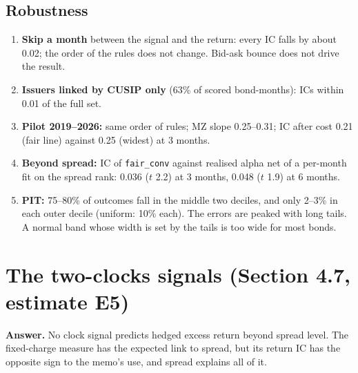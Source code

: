 \documentclass[11pt,a4paper]{article}
\newcommand{\code}[1]{\texttt{\small #1}}
\begin{document}
\subsection*{Robustness}
\begin{enumerate}
\item \textbf{Skip a month} between the signal and the return: every IC falls by about 0.02; the order of the rules does not change. Bid-ask bounce does not drive the result.
\item \textbf{Issuers linked by CUSIP only} (63\% of scored bond-months): ICs within 0.01 of the full set.
\item \textbf{Pilot 2019--2026:} same order of rules; MZ slope 0.25--0.31; IC after cost 0.21 (fair line) against 0.25 (widest) at 3 months.
\item \textbf{Beyond spread:} IC of \code{fair\_conv} against realised alpha net of a per-month fit on the spread rank: 0.036 ($t$ 2.2) at 3 months, 0.048 ($t$ 1.9) at 6 months.
\item \textbf{PIT:} 75--80\% of outcomes fall in the middle two deciles, and only 2--3\% in each outer decile (uniform: 10\% each). The errors are peaked with long tails. A normal band whose width is set by the tails is too wide for most bonds.
\end{enumerate}


\section{The two-clocks signals (Section 4.7, estimate E5)}\label{sec:clocks}
\textbf{Answer.} No clock signal predicts hedged excess return beyond spread level. The fixed-charge measure has the expected link to spread, but its return IC has the opposite sign to the memo's use, and spread explains all of it.
\end{document}
